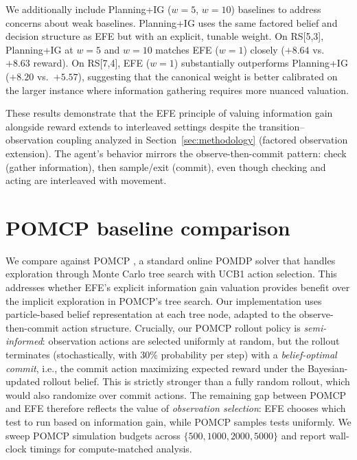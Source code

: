 \documentclass{article}
\begin{document}
We additionally include Planning+IG ($w{=}5$, $w{=}10$) baselines to address concerns about weak baselines. Planning+IG uses the same factored belief and decision structure as EFE but with an explicit, tunable weight. On RS[5,3], Planning+IG at $w{=}5$ and $w{=}10$ matches EFE ($w{=}1$) closely ($+8.64$ vs.\ $+8.63$ reward). On RS[7,4], EFE ($w{=}1$) substantially outperforms Planning+IG ($+8.20$ vs.\ $+5.57$), suggesting that the canonical weight is better calibrated on the larger instance where information gathering requires more nuanced valuation.

These results demonstrate that the EFE principle of valuing information gain alongside reward extends to interleaved settings despite the transition--observation coupling analyzed in Section~\ref{sec:methodology} (factored observation extension). The agent's behavior mirrors the observe-then-commit pattern: check (gather information), then sample/exit (commit), even though checking and acting are interleaved with movement.

\section{POMCP baseline comparison}
\label{app:pomcp}

We compare against POMCP \citep{silver2010}, a standard online POMDP solver that handles exploration through Monte Carlo tree search with UCB1 action selection. This addresses whether EFE's explicit information gain valuation provides benefit over the implicit exploration in POMCP's tree search. Our implementation uses particle-based belief representation at each tree node, adapted to the observe-then-commit action structure. Crucially, our POMCP rollout policy is \emph{semi-informed}: observation actions are selected uniformly at random, but the rollout terminates (stochastically, with 30\% probability per step) with a \emph{belief-optimal commit}, i.e., the commit action maximizing expected reward under the Bayesian-updated rollout belief. This is strictly stronger than a fully random rollout, which would also randomize over commit actions. The remaining gap between POMCP and EFE therefore reflects the value of \emph{observation selection}: EFE chooses which test to run based on information gain, while POMCP samples tests uniformly. We sweep POMCP simulation budgets across $\{500, 1000, 2000, 5000\}$ and report wall-clock timings for compute-matched analysis.
\end{document}
